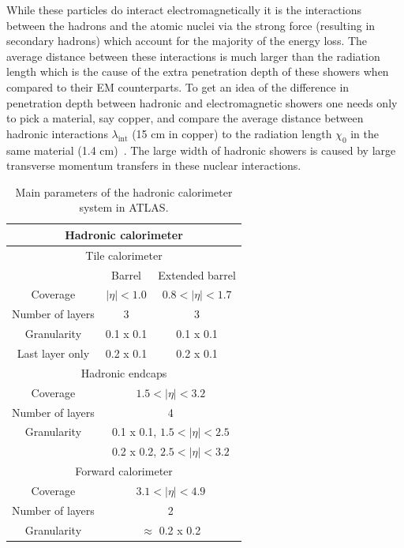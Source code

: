 While these particles do interact electromagnetically it is the interactions between the hadrons and the atomic nuclei via the strong force (resulting in secondary hadrons) which account for the majority of the energy loss.  
The average distance between these interactions is much larger than the radiation length which is the cause of the extra penetration depth of these showers when compared to their EM counterparts.  
To get an idea of the difference in penetration depth between hadronic and electromagnetic showers one needs only to pick a material, say copper, and compare the average distance between hadronic interactions $\lambda_{\mathrm{int}}$ (15 cm in copper) to the radiation length $\chi_{0}$ in the same material (1.4 cm)~\cite{Wigmans2008}.  
The large width of hadronic showers is caused by large transverse momentum transfers in these nuclear interactions.  

\begin{table}
  \centering
  \begin{tabular}{ |c|c|c|}
  \hline
  \multicolumn{3}{|c|}{\textbf{Hadronic calorimeter}} \\
  \hline
  \hline
  \multicolumn{3}{|c|}{Tile calorimeter} \\
  \hline 
                     & Barrel                                   & Extended barrel \\
  Coverage           & $\mid\eta\mid<1.0$                       & $0.8<\mid\eta\mid<1.7$ \\
  \hline 
  Number of layers   & 3                                        & 3 \\
  \hline 
  Granularity        & 0.1 x 0.1				& 0.1 x 0.1 \\
  Last layer only    & 0.2 x 0.1				& 0.2 x 0.1 \\
  \hline 
  \hline
  \multicolumn{3}{|c|}{Hadronic endcaps} \\
  \hline 
  Coverage           & 	\multicolumn{2}{|c|}{$1.5<\mid\eta\mid<3.2$} \\
  \hline
  Number of layers   &  \multicolumn{2}{|c|}{ 4} \\
  \hline
  Granularity        & 	\multicolumn{2}{|c|}{0.1 x 0.1, $1.5<\mid\eta\mid<2.5$} \\
  		     &  \multicolumn{2}{|c|}{ 0.2 x 0.2, $2.5<\mid\eta\mid<3.2$} \\
  \hline
  \hline
  \multicolumn{3}{|c|}{Forward calorimeter} \\
  \hline
  Coverage	     & \multicolumn{2}{|c|}{$3.1<\mid\eta\mid<4.9$} \\
  \hline
  Number of layers   & \multicolumn{2}{|c|}{2} \\
  \hline
  Granularity        & \multicolumn{2}{|c|}{$\approx$ 0.2 x 0.2} \\
  \hline
  \end{tabular}
  \caption[Main parameters of the hadronic calorimeter system. ]
        {\small Main parameters of the hadronic calorimeter system in ATLAS.\cite{1748-0221-3-08-S08003} }
\label{table:HadCalo}
\end{table}

